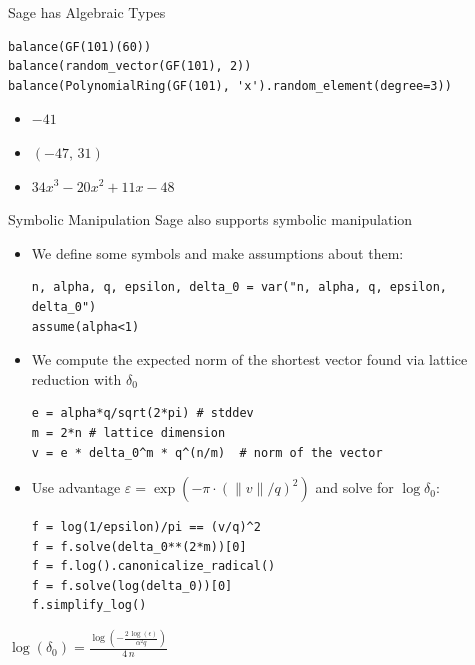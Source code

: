 \documentclass[presentation,smaller]{beamer}
\begin{document}
\begin{frame}{Sage has Algebraic Types}
\begin{lstlisting}
balance(GF(101)(60))
balance(random_vector(GF(101), 2))
balance(PolynomialRing(GF(101), 'x').random_element(degree=3))
\end{lstlisting}

\begin{itemize}
\item \(-41\)
\item \(\left(-47,\,31\right)\)
\item \(34x^{3} - 20x^{2} + 11x - 48\)
\end{itemize}
\end{frame}

\begin{frame}{Symbolic Manipulation}
 Sage also supports symbolic manipulation

\begin{itemize}
\item We define some symbols and make assumptions about them:

\lstset{language=sage,label= ,caption= ,captionpos=b,numbers=none}
\begin{lstlisting}
n, alpha, q, epsilon, delta_0 = var("n, alpha, q, epsilon, delta_0")
assume(alpha<1)
\end{lstlisting}

\item We compute the expected norm of the shortest vector found via lattice reduction with \(δ_0\)

\lstset{language=sage,label= ,caption= ,captionpos=b,numbers=none}
\begin{lstlisting}
e = alpha*q/sqrt(2*pi) # stddev
m = 2*n # lattice dimension
v = e * delta_0^m * q^(n/m)  # norm of the vector
\end{lstlisting}

\framebreak

\item Use advantage  \(ε = \exp\left(-π⋅(\|v\|/q)^2\right)\) and solve for \(\log δ_0\):

\lstset{language=sage,label= ,caption= ,captionpos=b,numbers=none}
\begin{lstlisting}
f = log(1/epsilon)/pi == (v/q)^2
f = f.solve(delta_0**(2*m))[0]
f = f.log().canonicalize_radical()
f = f.solve(log(delta_0))[0]
f.simplify_log()
\end{lstlisting}
\end{itemize}

\begin{center}
\(\log\left(\delta_{0}\right) = \frac{\log\left(-\frac{2 \, \log\left(\epsilon\right)}{\alpha^{2} q}\right)}{4 \, n}\)
\end{center}
\end{frame}
\end{document}
